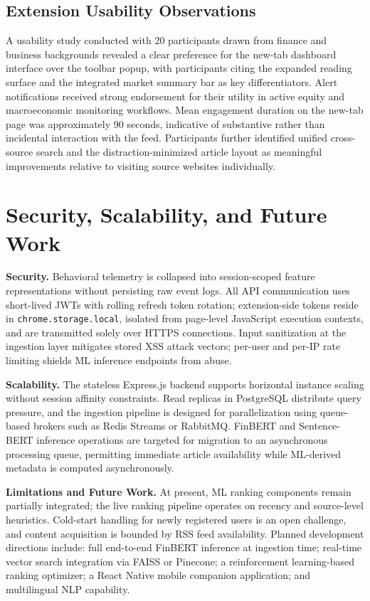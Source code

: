 \documentclass[conference]{IEEEtran}
\begin{document}
\subsection{Extension Usability Observations}
A usability study conducted with 20 participants drawn from finance and business backgrounds revealed a clear preference for the new-tab dashboard interface over the toolbar popup, with participants citing the expanded reading surface and the integrated market summary bar as key differentiators. Alert notifications received strong endorsement for their utility in active equity and macroeconomic monitoring workflows. Mean engagement duration on the new-tab page was approximately 90 seconds, indicative of substantive rather than incidental interaction with the feed. Participants further identified unified cross-source search and the distraction-minimized article layout as meaningful improvements relative to visiting source websites individually.

\section{Security, Scalability, and Future Work}

\textbf{Security.} Behavioral telemetry is collapsed into session-scoped feature representations without persisting raw event logs. All API communication uses short-lived JWTs with rolling refresh token rotation; extension-side tokens reside in \texttt{chrome.storage.local}, isolated from page-level JavaScript execution contexts, and are transmitted solely over HTTPS connections. Input sanitization at the ingestion layer mitigates stored XSS attack vectors; per-user and per-IP rate limiting shields ML inference endpoints from abuse.

\textbf{Scalability.} The stateless Express.js backend supports horizontal instance scaling without session affinity constraints. Read replicas in PostgreSQL distribute query pressure, and the ingestion pipeline is designed for parallelization using queue-based brokers such as Redis Streams or RabbitMQ. FinBERT and Sentence-BERT inference operations are targeted for migration to an asynchronous processing queue, permitting immediate article availability while ML-derived metadata is computed asynchronously.

\textbf{Limitations and Future Work.} At present, ML ranking components remain partially integrated; the live ranking pipeline operates on recency and source-level heuristics. Cold-start handling for newly registered users is an open challenge, and content acquisition is bounded by RSS feed availability. Planned development directions include: full end-to-end FinBERT inference at ingestion time; real-time vector search integration via FAISS \cite{johnson2019faiss} or Pinecone; a reinforcement learning-based ranking optimizer; a React Native mobile companion application; and multilingual NLP capability.
\end{document}
